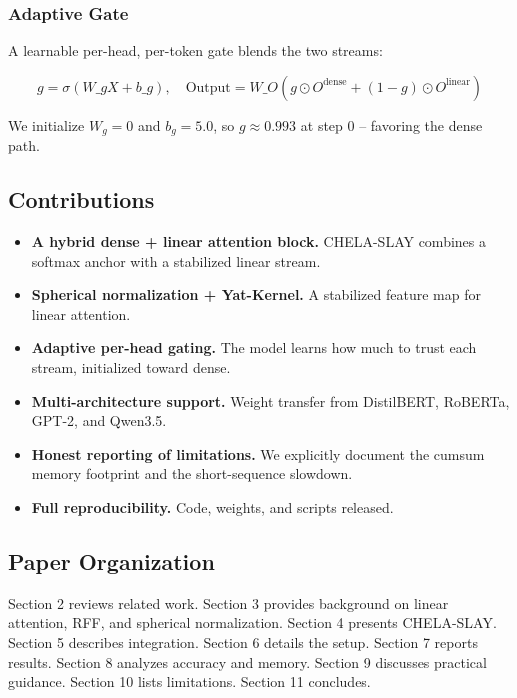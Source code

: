 \subsubsection{Adaptive Gate}

A learnable per-head, per-token gate blends the two streams:

\[
g = \sigma(W\_g X + b\_g), \quad
\text{Output} = W\_O \left( g \odot O^\text{dense} + (1 - g) \odot O^\text{linear} \right)
\]

We initialize $W_g = 0$ and $b_g = 5.0$, so 
$g \approx 0.993$ at step 0 -- favoring the dense path.

\subsection{Contributions}

\begin{itemize}
\item \textbf{A hybrid dense + linear attention block.} CHELA-SLAY combines a
  softmax anchor with a stabilized linear stream.
\item \textbf{Spherical normalization + Yat-Kernel.} A stabilized feature map for
  linear attention.
\item \textbf{Adaptive per-head gating.} The model learns how much to trust each
  stream, initialized toward dense.
\item \textbf{Multi-architecture support.} Weight transfer from DistilBERT, RoBERTa,
  GPT-2, and Qwen3.5.
\item \textbf{Honest reporting of limitations.} We explicitly document the cumsum
  memory footprint and the short-sequence slowdown.
\item \textbf{Full reproducibility.} Code, weights, and scripts released.

\end{itemize}
\subsection{Paper Organization}

Section 2 reviews related work. Section 3 provides background on linear 
attention, RFF, and spherical normalization. Section 4 presents CHELA-SLAY. 
Section 5 describes integration. Section 6 details the setup. Section 7 
reports results. Section 8 analyzes accuracy and memory. Section 9 
discusses practical guidance. Section 10 lists limitations. Section 11 
concludes.



